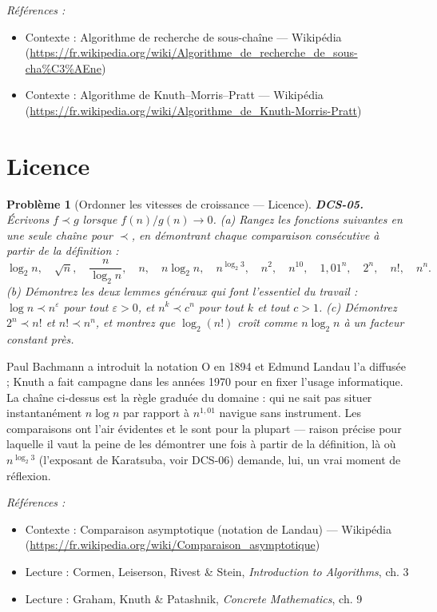 \documentclass[11pt]{article}
\newtheorem{problem}{Problème}
\newenvironment{refs}{\par\small\noindent\emph{Références :}\begin{itemize}\setlength\itemsep{0pt}}{\end{itemize}\normalsize}
\begin{document}
\begin{refs}
\item Contexte : Algorithme de recherche de sous-chaîne --- Wikipédia (\url{https://fr.wikipedia.org/wiki/Algorithme_de_recherche_de_sous-cha%C3%AEne})
\item Contexte : Algorithme de Knuth--Morris--Pratt --- Wikipédia (\url{https://fr.wikipedia.org/wiki/Algorithme_de_Knuth-Morris-Pratt})
\end{refs}

\bigskip


\section*{Licence}

\begin{problem}[{Ordonner les vitesses de croissance --- Licence}]
\textbf{DCS-05.} Écrivons $f \prec g$ lorsque $f(n)/g(n) \to 0$. (a) Rangez les fonctions suivantes en une seule chaîne pour $\prec$, en démontrant chaque comparaison consécutive à partir de la définition :
\[ \log_2 n,\quad \sqrt{n},\quad \frac{n}{\log_2 n},\quad n,\quad n\log_2 n,\quad n^{\log_2 3},\quad n^2,\quad n^{10},\quad 1{,}01^n,\quad 2^n,\quad n!,\quad n^n. \]
(b) Démontrez les deux lemmes généraux qui font l'essentiel du travail : $\log n \prec n^{\varepsilon}$ pour tout $\varepsilon > 0$, et $n^k \prec c^n$ pour tout $k$ et tout $c > 1$. (c) Démontrez $2^n \prec n!$ et $n! \prec n^n$, et montrez que $\log_2(n!)$ croît comme $n \log_2 n$ à un facteur constant près.
\end{problem}

\noindent Paul Bachmann a introduit la notation O en 1894 et Edmund Landau l'a diffusée ; Knuth a fait campagne dans les années 1970 pour en fixer l'usage informatique. La chaîne ci-dessus est la règle graduée du domaine : qui ne sait pas situer instantanément $n \log n$ par rapport à $n^{1{,}01}$ navigue sans instrument. Les comparaisons ont l'air évidentes et le sont pour la plupart --- raison précise pour laquelle il vaut la peine de les démontrer une fois à partir de la définition, là où $n^{\log_2 3}$ (l'exposant de Karatsuba, voir DCS-06) demande, lui, un vrai moment de réflexion.

\begin{refs}
\item Contexte : Comparaison asymptotique (notation de Landau) --- Wikipédia (\url{https://fr.wikipedia.org/wiki/Comparaison_asymptotique})
\item Lecture : Cormen, Leiserson, Rivest \& Stein, \textit{Introduction to Algorithms}, ch. 3
\item Lecture : Graham, Knuth \& Patashnik, \textit{Concrete Mathematics}, ch. 9
\end{refs}
\end{document}
